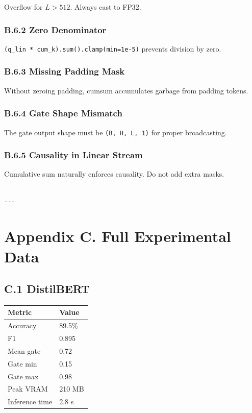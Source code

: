 Overflow for $L > 512$. Always cast to FP32.

\subsubsection{B.6.2 Zero Denominator}

\texttt{(q\_lin * cum\_k).sum().clamp(min=1e-5)} prevents division by zero.

\subsubsection{B.6.3 Missing Padding Mask}

Without zeroing padding, cumsum accumulates garbage from padding tokens.

\subsubsection{B.6.4 Gate Shape Mismatch}

The gate output shape must be \texttt{(B, H, L, 1)} for proper broadcasting.

\subsubsection{B.6.5 Causality in Linear Stream}

Cumulative sum naturally enforces causality. Do not add extra masks.
\begin{lstlisting}

---
\end{lstlisting}


\section{Appendix C. Full Experimental Data}

\subsection{C.1 DistilBERT}

\begin{table}[H]
\centering
\small
\begin{tabular}{ll}
\toprule
\textbf{Metric} & \textbf{Value} \\
\midrule
Accuracy & 89.5\% \\
F1 & 0.895 \\
Mean gate & 0.72 \\
Gate min & 0.15 \\
Gate max & 0.98 \\
Peak VRAM & 210 MB \\
Inference time & 2.8 s \\
\bottomrule
\end{tabular}
\end{table}


